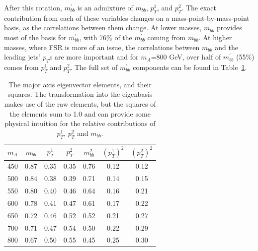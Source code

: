 After this rotation, $m_{bb}^{'}$ is an admixture of $m_{bb}$, $p_T^1$, and 
$p_T^2$.  The exact contribution from each of these variables changes on a mass-point-by-mass-point
basis, as the correlations between them change.  At lower masses, $m_{bb}$ provides
most of the basis for $m_{bb}^{'}$, with 76\% of the $m_{bb}^{'}$ coming from 
$m_{bb}$.  At higher masses, where FSR is more of an issue, the correlations between 
$m_{bb}$ and the leading jets' $p_T$s are more important and for $m_A$=800 GeV,
over half of $m_{bb}^{'}$ (55\%) comes from $p_T^1$ and $p_T^2$.  The full set 
of $m_{bb}^{'}$ components can be found in Table~\ref{tab:eigenvector_elements}.




\begin{table}
    \center
    \caption{The major axis eigenvector elements, and their squares.  The
    transformation into the eigenbasis makes use of the raw elements, but the
    squares of the elements sum to 1.0 and can provide some physical intuition
    for the relative contributions of $p_T^1$, $p_T^2$ and $m_{bb}$. \label{tab:eigenvector_elements}}
    \begin{tabular}{ c c c c c c c } \hline \hline
        $m_A$ & $m_{bb}$ & $p_T^1$ & $p_T^2$ & $m_{bb}^2$ & $(p_T^{1})^2$ & $(p_T^2)^2$ \\ \hline
        450 & 0.87 & 0.35 & 0.35 & 0.76 & 0.12 & 0.12 \\
        500 & 0.84 & 0.38 & 0.39 & 0.71 & 0.14 & 0.15 \\
        550 & 0.80 & 0.40 & 0.46 & 0.64 & 0.16 & 0.21 \\
        600 & 0.78 & 0.41 & 0.47 & 0.61 & 0.17 & 0.22 \\
        650 & 0.72 & 0.46 & 0.52 & 0.52 & 0.21 & 0.27 \\
        700 & 0.71 & 0.47 & 0.54 & 0.50 & 0.22 & 0.29 \\
        800 & 0.67 & 0.50 & 0.55 & 0.45 & 0.25 & 0.30 \\ 
        \hline
    \end{tabular}
\end{table} 

